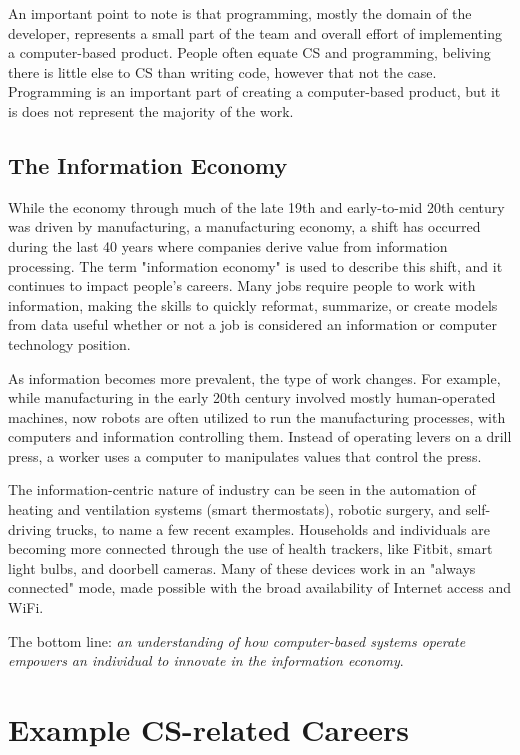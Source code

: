 An important point to note is that programming, mostly the domain of the developer, represents a small part of the team and overall effort of implementing a computer-based product. People often equate CS and programming, beliving there is little else to CS than writing code, however that not the case. Programming is an important part of creating a computer-based product, but it is does not represent the majority of the work.



\subsection{The Information Economy}


While the economy through much of the late 19th and early-to-mid 20th century was driven by manufacturing, a manufacturing economy, a shift has occurred during the last 40 years where companies derive value from information processing. The term "information economy" is used to describe this shift, and it continues to impact people's careers. Many jobs require people to work with information, making the skills to quickly reformat, summarize, or create models from data useful whether or not a job is considered an information or computer technology position.

As information becomes more prevalent, the type of work changes. For example, while manufacturing in the early 20th century involved mostly human-operated machines, now robots are often utilized to run the manufacturing processes, with computers and information controlling them. Instead of operating levers on a drill press, a worker uses a computer to manipulates values that control the press.

The information-centric nature of industry can be seen in the automation of heating and ventilation systems (smart thermostats), robotic surgery, and self-driving trucks, to name a few recent examples. Households and individuals are becoming more connected through the use of health trackers, like Fitbit, smart light bulbs, and doorbell cameras. Many of these devices work in an "always connected" mode, made possible with the broad availability of Internet access and WiFi.

The bottom line: \emph{an understanding of how computer-based systems operate empowers an individual to innovate in the information economy}.  

	
\section{Example CS-related Careers}

